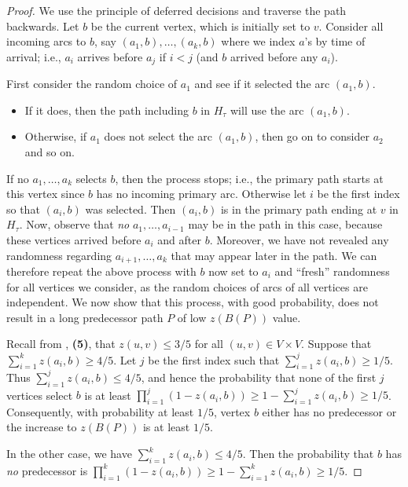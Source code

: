 \begin{proof}
  We use the principle of deferred decisions and traverse the path backwards. Let $b$ be the current vertex, which is initially set to $v$. 
  Consider all incoming arcs to $b$, say $(a_1, b), \ldots, (a_k, b)$ where we index $a$'s by time of arrival; i.e., $a_i$ arrives before $a_j$ if $i<j$ (and $b$ arrived before any $a_i$).
  
  First consider the random choice of $a_1$ and  see if it selected the arc $(a_1, b)$. 
  \begin{itemize}
    \item If it does, then the path including $b$ in $H_\tau$ will use the arc $(a_1, b)$. 
    \item Otherwise, if $a_1$ does not select the arc $(a_1, b)$, then go on to consider $a_2$ and so on.
  \end{itemize}
  If no $a_1, \ldots, a_k$ selects $b$, then the process stops; i.e., the primary path starts at this vertex since $b$ has no incoming primary arc. 
  Otherwise let $i$ be the first index so that $(a_i, b)$ was selected. Then $(a_i, b)$ is in the primary path ending at $v$ in $H_\tau$. 
  Now, observe that \emph{no} $a_1, \ldots, a_{i-1}$ may be in the path in this case, because these vertices arrived before $a_i$ and after $b$. 
  Moreover, we have not revealed any randomness regarding $a_{i+1}, \ldots, a_{k}$ that may appear later in the path. 
  We can therefore repeat the above process with $b$ now set to $a_i$ and ``fresh'' randomness for all vertices we consider, as the random choices of arcs of all vertices are independent. 
  We now show that this process, with good probability, does not result in a long predecessor path $P$ of low $z(B(P))$ value.

  Recall from , {\bf (5)}, that $z(u,v) \leq 3/5$ for all $(u,v) \in V\times V$. 
  Suppose that $\sum_{i = 1}^k z(a_i, b) \geq 4/5$.
  Let $j$ be the first index such that $\sum_{i = 1}^j z(a_i, b) \geq 1/5$. 
  Thus $\sum_{i=1}^{j} z(a_i, b) \leq 4/5$, and hence the probability that none of the first $j$ vertices select $b$ is at least $\prod_{i=1}^j(1 - z(a_i, b)) \geq  1 - \sum_{i=1}^j z(a_i, b) \geq 1/5$. 
  Consequently, with probability at least $1/5$, vertex $b$ either has no predecessor or the increase to $z(B(P))$ is at least $1/5$.

  In the other case, we have $\sum_{i=1}^k z(a_i, b)\leq 4/5$. Then the probability that $b$ has \emph{no} predecessor is 
  $\prod_{i=1}^k (1 - z(a_i, b)) \geq  1 - \sum_{i=1}^k z(a_i, b) \geq 1/5$.


\end{proof}
